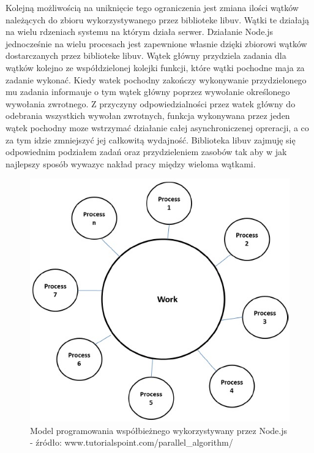\documentclass[12pt]{report}
\begin{document}
Kolejną możliwością na uniknięcie tego ograniczenia jest zmiana ilości wątków należących do zbioru wykorzystywanego przez biblioteke libuv. 
Wątki te działają na wielu rdzeniach systemu na którym działa serwer. 
Działanie Node.js jednocześnie na wielu procesach jest zapewnione własnie dzięki zbiorowi wątków dostarczanych przez biblioteke libuv.
Wątek główny przydziela zadania dla wątków kolejno ze współdzielonej kolejki funkcji, które wątki pochodne maja za zadanie wykonać. 
Kiedy watek pochodny zakończy wykonywanie przydzielonego mu zadania informauje o tym wątek główny poprzez wywołanie określonego wywołania zwrotnego. 
Z przyczyny odpowiedzialności przez watek główny do odebrania wszystkich wywołan zwrotnych, funkcja wykonywana przez jeden wątek pochodny moze wstrzymać działanie całej asynchroniczenej opreracji, a co za tym idzie zmniejszyć jej całkowitą wydajność. 
Biblioteka libuv zajmuję się odpowiednim podziałem zadań oraz przydzieleniem zasobów tak aby w jak najlepszy sposób wywazyc nakład pracy między wieloma wątkami. 

\begin{figure}[!hb]
\centering
\includegraphics[width=\textwidth,height=\textheight,keepaspectratio]{thread.png} 
\caption{Model programowania współbieżnego wykorzystywany przez Node.js - źródło: www.tutorialspoint.com/parallel\_algorithm/}
\end{figure}
\end{document}
